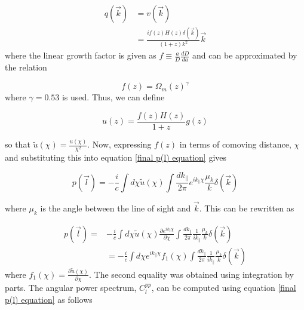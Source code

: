 \documentclass[12pt]{article}
\begin{document}
\begin{equation}
\begin{aligned}
q(\vec{k})&= v(\vec{k})\\
&=\frac{if(z)H(z)\delta(\vec{k})}{(1+z)k^2}\vec{k}
\end{aligned}
\end{equation}
where the linear growth factor is given as $f\equiv\frac{a}{D}\frac{dD}{da}$ and can be approximated by the relation 

\begin{equation}
f(z)=\Omega_m(z)^\gamma
\end{equation}
where $\gamma=0.53$ is used. 
Thus, we can define 

\begin{equation}
u(z)=\frac{f(z)H(z)}{1+z}g(z)
\end{equation}

so that $\widetilde{u}(\chi)=\frac{u(\chi)}{\chi^2}$. Now, expressing $f(z)$ in terms of comoving distance, $\chi$ and substituting this into equation \ref{final p(l) equation} gives

\begin{equation}\label{final p(l) eqn in terms of f}
p(\vec{l})=-\frac{i}{c}\int d\chi \widetilde{u}(\chi) \int \frac{dk_\parallel}{2\pi} e^{ik_{\parallel}\chi } \frac{\mu_k}{k} \delta(\vec{k})
\end{equation}

where $\mu_k$ is the angle between the line of sight and $\vec{k}$. This can be rewritten as 

\begin{equation}\label{final p(l) eqn in terms of f with partial deriv}
\begin{aligned}
p(\vec{l})=&-\frac{i}{c}\int d\chi \widetilde{u}(\chi) \frac{\partial e^{ik_{\parallel}\chi }}{\partial \chi} \int \frac{dk_\parallel}{2\pi} \frac{1}{ik_{\parallel}}\frac{\mu_k}{k} \delta(\vec{k})\\
&=-\frac{i}{c}\int d\chi e^{ik_{\parallel}\chi}f_1({\chi}) \int \frac{dk_\parallel}{2\pi} \frac{1}{ik_{\parallel}}\frac{\mu_k}{k} \delta(\vec{k})
\end{aligned}
\end{equation}
where $f_1({\chi})=\frac{\partial \widetilde{u}(\chi)}{\partial \chi}$. The second equality was obtained using integration by parts.
The angular power spectrum, $C_l^{pp}$, can be computed using equation \ref{final p(l) equation} as follows
\end{document}
